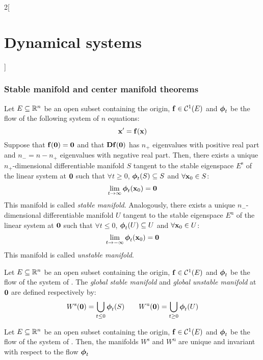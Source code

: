 \documentclass[../../../main_math.tex]{subfiles}
\begin{document}
\begin{multicols}{2}[\section{Dynamical systems}]
  \subsubsection{Stable manifold and center manifold theorems}
  \begin{theorem}
    Let $E\subseteq\mathbb{R}^n$ be an open subset containing the origin, $\boldsymbol{\mathrm{f}}\in\mathcal{C}^1(E)$ and $\boldsymbol{\mathrm{\phi}}_t$ be the flow of the following system of $n$ equations:
    \begin{equation}\label{DS:general}
      \boldsymbol{\mathrm{x}}' =\boldsymbol{\mathrm{f}}(\boldsymbol{\mathrm{x}})
    \end{equation}
    Suppose that $\boldsymbol{\mathrm{f}}(\boldsymbol{\mathrm{0}})=\boldsymbol{\mathrm{0}}$ and that $\boldsymbol{\mathrm{Df}}(\boldsymbol{\mathrm{0}})$ has $n_+$ eigenvalues with positive real part and $n_-=n-n_+$ eigenvalues with negative real part. Then, there exists a unique $n_+$-dimensional differentiable manifold $S$ tangent to the stable eigenspace $E^\text{s}$ of the linear system at $\boldsymbol{\mathrm{0}}$ such that $\forall t\geq 0$, $\boldsymbol{\mathrm{\phi}}_t(S)\subseteq S$ and $\forall \boldsymbol{\mathrm{x}}_0\in S$: $$\lim_{t\to\infty}\boldsymbol{\mathrm{\phi}}_t(\boldsymbol{\mathrm{x}}_0)=\boldsymbol{\mathrm{0}}$$
    This manifold is called \emph{stable manifold}.
    Analogously, there exists a unique $n_-$-dimensional differentiable manifold $U$ tangent to the stable eigenspace $E^\text{u}$ of the linear system at $\boldsymbol{\mathrm{0}}$ such that $\forall t\leq 0$, $\boldsymbol{\mathrm{\phi}}_t(U)\subseteq U$ and $\forall \boldsymbol{\mathrm{x}}_0\in U$: $$\lim_{t\to-\infty}\boldsymbol{\mathrm{\phi}}_t(\boldsymbol{\mathrm{x}}_0)=\boldsymbol{\mathrm{0}}$$
    This manifold is called \emph{unstable manifold}.
  \end{theorem}
  \begin{definition}
    Let $E\subseteq\mathbb{R}^n$ be an open subset containing the origin, $\boldsymbol{\mathrm{f}}\in\mathcal{C}^1(E)$ and $\boldsymbol{\mathrm{\phi}}_t$ be the flow of the system of . The \emph{global stable manifold} and \emph{global unstable manifold} at $\boldsymbol{\mathrm{0}}$ are defined respectively by:
    $$W^\text{s}(\boldsymbol{\mathrm{0}})=\bigcup_{t\leq 0}\boldsymbol{\mathrm{\phi}}_t(S)\qquad W^\text{u}(\boldsymbol{\mathrm{0}})=\bigcup_{t\geq 0}\boldsymbol{\mathrm{\phi}}_t(U)$$
  \end{definition}
  \begin{proposition}
    Let $E\subseteq\mathbb{R}^n$ be an open subset containing the origin, $\boldsymbol{\mathrm{f}}\in\mathcal{C}^1(E)$ and $\boldsymbol{\mathrm{\phi}}_t$ be the flow of the system of . Then, the manifolds $W^\text{s}$ and $W^\text{u}$ are unique and invariant with respect to the flow $\boldsymbol{\mathrm{\phi}}_t$
  \end{proposition}
  \begin{theorem}

\end{theorem}
\end{multicols}
\end{document}
